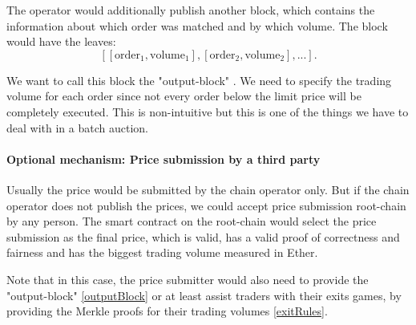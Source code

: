 \documentclass[11pt,parskip=full]{scrartcl}%
\begin{document}
The operator would additionally publish another block, which contains the information about which order was matched and by which volume. 
The block would have the leaves:
\[[[\text{order}_1, \text{volume}_1], [\text{order}_2, \text{volume}_2],...].\]

We want to call this block the "output-block" \label{outputBlock}. 
We need to specify the trading volume for each order since not every order below the limit price will be completely executed. 
This is non-intuitive but this is one of the things we have to deal with in a batch auction. 
\paragraph{Optional mechanism: Price submission by a third party}
Usually the price would be submitted by the chain operator only. 
But if the chain operator does not publish the prices, we could accept price submission root-chain by any person. 
The smart contract on the root-chain would select the price submission as the final price, which is valid, has a valid proof of correctness and fairness and has the biggest trading volume measured in Ether. 

Note that in this case, the price submitter would also need to provide the "output-block" \ref{outputBlock} or at least assist traders with their exits games, by providing the Merkle proofs for their trading volumes \ref{exitRules}. 
\end{document}
